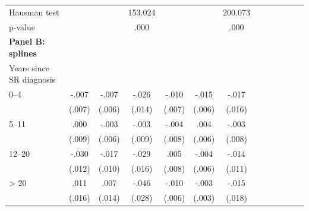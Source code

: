 \documentclass[12pt,english]{article}
\begin{document}
\begin{table}[p]
\begin{center}
\begin{adjustbox}{max width=0.8\linewidth}
\begin{threeparttable}
{\begin{tabular}{l*{6}{S
								S}}
						
						Hausman test    &                  &                  &  153.024         &                  &                  &  200.073         \\
						\hspace*{10mm} p-value         &                  &                  &     .000         &                  &                  &     .000         \\
						\addlinespace
						\textbf{Panel B: splines}&&&&&&\\
						Years since SR diagnosis  &&&&&&\\
						\hspace*{10mm}0--4&    -.007         &    -.007         &    -.026\sym{*}  &    -.010         &    -.015\sym{**} &    -.017         \\
						&   (.007)         &   (.006)         &   (.014)         &   (.007)         &   (.006)         &   (.016)         \\
						\hspace*{10mm}5--11&     .000         &    -.003         &    -.003         &    -.004         &     .004         &    -.003         \\
						&   (.009)         &   (.006)         &   (.009)         &   (.008)         &   (.006)         &   (.008)         \\
						\hspace*{10mm}12--20&  -.030\sym{**} &    -.017\sym{*}  &    -.029\sym{*}  &     .005         &    -.004         &    -.014         \\
						&   (.012)         &   (.010)         &   (.016)         &   (.008)         &   (.006)         &   (.011)         \\
						\hspace*{10mm}> 20&     .011         &     .007         &    -.046\sym{*}  &    -.010\sym{*}  &    -.003         &    -.015         \\
						&   (.016)         &   (.014)         &   (.028)         &   (.006)         &   (.003)         &   (.018)         \\
						

\end{tabular}}
\end{threeparttable}
\end{adjustbox}
\end{center}
\end{table}
\end{document}
